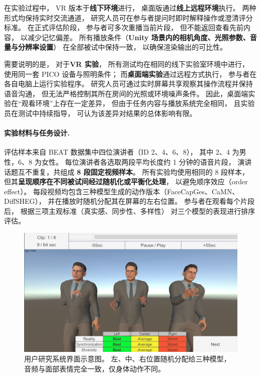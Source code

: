 在实验过程中，
VR 版本于\textbf{线下环境}进行，
桌面版通过\textbf{线上远程环境}执行。
两种形式均保持实时交流通道，
研究人员可在参与者提问时即时解释操作或澄清评分标准。
在正式评估阶段，
参与者可多次重播当前片段，
但不能返回查看先前内容，
以减少记忆偏差。
所有播放条件（\textbf{Unity 场景内的相机角度、光照参数、音量与分辨率设置}）
在全部被试中保持一致，
以确保渲染输出的可比性。

需要说明的是，
对于\textbf{VR 实验}，
所有测试均在相同的线下实验室环境中进行，
使用同一套 PICO 设备与照明条件；
而\textbf{桌面端实验}通过远程方式执行，
参与者在各自电脑上运行实验程序。
研究人员可通过实时屏幕共享观察其操作流程并保持语音沟通，
但无法严格控制其所在房间的光照或环境噪声条件。
因此，桌面端实验在“观看环境”上存在一定差异，
但由于任务内容与播放系统完全相同，
且实验员在测试中持续指导，
可认为该差异对结果的总体影响有限。

\paragraph{实验材料与任务设计.}
评估样本来自 BEAT 数据集中四位演讲者（ID 2、4、6、8），
其中 2、4 为男性，6、8 为女性。
每位演讲者各选取两段平均长度约 1 分钟的语音片段，
演讲话题互不重复，共组成 \textbf{8 段固定视频样本}。
所有实验均使用相同的 8 段样本，
但其\textbf{呈现顺序在不同被试间经过随机化或平衡化处理}，
以避免顺序效应（order effect）。
每段视频均包含三种模型生成的动作版本（FaceCapGes、CaMN、DiffSHEG），
并在播放时随机分配其在屏幕的左右位置。
参与者在观看每个片段后，
根据三项主观标准（真实感、同步性、多样性）
对三个模型的表现进行排序评估。

\begin{figure}[h!t]
\centering
\includegraphics[width=\linewidth]{figures/UserStudyImage.png}
\caption{用户研究系统界面示意图。
左、中、右位置随机分配给三种模型，
音频与面部表情完全一致，仅身体动作不同。}
\label{fig:userstudy_app}
\end{figure}

